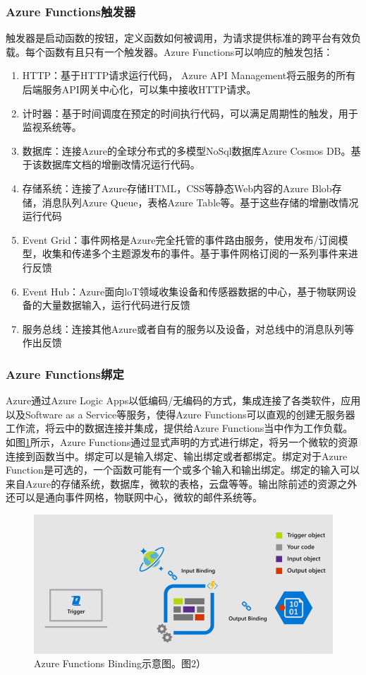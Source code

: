 \documentclass[11pt]{article}
\begin{document}
\subsubsection{Azure Functions触发器}
触发器是启动函数的按钮，定义函数如何被调用，为请求提供标准的跨平台有效负载。每个函数有且只有一个触发器。Azure Functions可以响应的触发包括：
\begin{enumerate}
	\item HTTP：基于HTTP请求运行代码， Azure API Management将云服务的所有后端服务API网关中心化，可以集中接收HTTP请求。
	\item 计时器：基于时间调度在预定的时间执行代码，可以满足周期性的触发，用于监视系统等。
	\item 数据库：连接Azure的全球分布式的多模型NoSql数据库Azure Cosmos DB。基于该数据库文档的增删改情况运行代码。
	\item 存储系统：连接了Azure存储HTML，CSS等静态Web内容的Azure Blob存储，消息队列Azure Queue，表格Azure Table等。基于这些存储的增删改情况运行代码
	\item Event Grid：事件网格是Azure完全托管的事件路由服务，使用发布/订阅模型，收集和传递多个主题源发布的事件。基于事件网格订阅的一系列事件来进行反馈
	\item Event Hub：Azure面向loT领域收集设备和传感器数据的中心，基于物联网设备的大量数据输入，运行代码进行反馈
	\item 服务总线：连接其他Azure或者自有的服务以及设备，对总线中的消息队列等作出反馈
\end{enumerate}
\subsubsection{Azure Functions绑定}
Azure通过Azure Logic Apps以低编码/无编码的方式，集成连接了各类软件，应用以及Software as a Service等服务，使得Azure Functions可以直观的创建无服务器工作流，将云中的数据连接并集成，提供给Azure Functions当中作为工作负载。如图\ref{figs:bind}所示，Azure Functions通过显式声明的方式进行绑定，将另一个微软的资源连接到函数当中。绑定可以是输入绑定、输出绑定或者都绑定。绑定对于Azure Function是可选的，一个函数可能有一个或多个输入和输出绑定。绑定的输入可以来自Azure的存储系统，数据库，微软的表格，云盘等等。输出除前述的资源之外还可以是通向事件网格，物联网中心，微软的邮件系统等。
\begin{figure}[!htbp]
	\centering
	\includegraphics[width=0.6\linewidth]{figs/AzureBindings.png}
	\caption{Azure Functions Binding示意图。\cite{binding}图2）}
	\label{figs:bind}
\end{figure}
\end{document}
